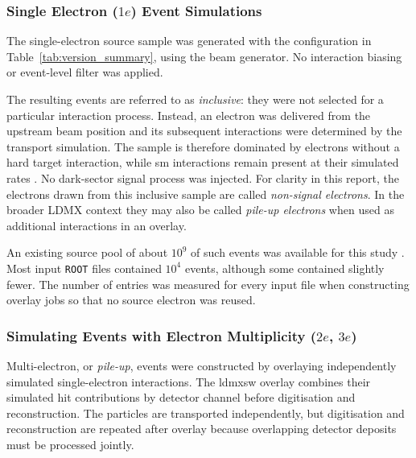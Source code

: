 \subsubsection{Single Electron ($1e$) Event Simulations}
\label{sec:1e_sim}


The single-electron source sample was generated with the configuration in
Table~\ref{tab:version_summary}, using the
 beam generator. No interaction biasing
or event-level filter was applied.

The resulting events are referred to as \emph{inclusive}: they were not
selected for a particular interaction process. Instead, an electron was
delivered from the upstream beam position and its subsequent
interactions were determined by the transport simulation. The sample is
therefore dominated by electrons without a hard target interaction, while
\gls{sm} interactions remain present at their simulated rates
\cite{ldmx2025-overview}. No dark-sector signal process was injected. For clarity in this
report, the electrons drawn from this inclusive sample are called
\emph{non-signal electrons}. In the broader LDMX context they may also be
called \emph{pile-up electrons} when used as additional interactions in an
overlay.

An existing source pool of about \(10^9\) of such events was available
for this study \cite{hans_alin}. Most input \texttt{ROOT} files contained \(10^4\) events,
although some contained slightly fewer. The number of entries was measured
for every input file when constructing overlay jobs so that no source
electron was reused.

\subsubsection{Simulating Events with Electron Multiplicity ($2e$, $3e$)}
\label{sec:2e_sim}

Multi-electron, or \emph{pile-up}, events were constructed by overlaying
independently simulated single-electron interactions. The \gls{ldmxsw}
overlay combines their simulated hit contributions by detector channel before
digitisation and reconstruction. The particles are transported independently,
but digitisation and reconstruction are repeated after overlay because
overlapping detector deposits must be processed jointly.

